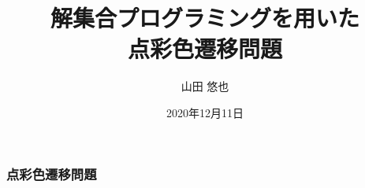\documentclass[dvipdfmx,11pt]{beamer}
\title{解集合プログラミングを用いた\\点彩色遷移問題}
\author{山田 悠也}
\date{2020年12月11日\\}
\institute{番原研究室}
\begin{document}
\begin{frame}\frametitle{}
  \titlepage
\end{frame}

\begin{frame}\frametitle{点彩色遷移問題}

\end{frame}











\end{document}
